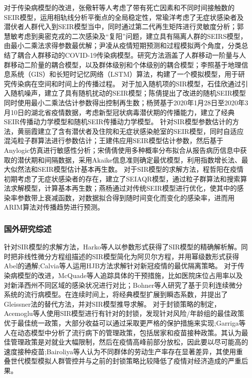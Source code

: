 对于传染病模型的改进，张儆轩\cite{张儆轩2021考虑死亡因素和不同时段接触数的}等人考虑了带有死亡因素和不同时间接触数的SEIR模型，运用相轨线分析平衡点的全局稳定性，常瑜洋\cite{常瑜洋2023基于}考虑了无症状感染者及潜伏者人群代入到SEIR模型当中，同时通过第二代再生矩阵进行灵敏度分析；郭慧敏\cite{郭慧敏2023基于隔离人群的}考虑到奥密克戎的二次感染及“复阳”问题，建立具有隔离人群的SEIRS模型，由最小二乘法求得参数最优解；尹凌\cite{尹凌2021耦合人群移动的}从疫情短期预测和过程模拟两个角度，分类总结了耦合人群移动的COVID-19传染病模型。研究方法涵盖了人群移动一阶量与人群移动二阶量的耦合模型，以及群体级别和个体级别的耦合模型；李照\cite{李照2021一种耦合}基于地理信息系统（GIS）和长短时记忆网络（LSTM）算法，构建了一个模拟模型，用于研究传染病在空间和时间上的传播过程。
对于加入随机项的SIR模型，石佳欣\cite{石佳欣2022一类随机系统基本再生数的计算与应用}通过引入随机噪声，建立了具有随机扰动的SEIR模型；陈倩\cite{陈倩2023基于改进的随机}提出了改进的随机SEIR模型同时使用最小二乘法估计参数得出控制再生数；杨赟\cite{杨赟2022基于随机}基于2020年1月28日至2020年3月10日的湖北省疫情数据，考虑新型冠状病毒潜伏期的传播能力，建立了经典SEIR传播动力学模型和随机SEIR传播动力学模型。
针对SIR模型参数估计的方法，黄丽霞\cite{黄丽霞2023基于分阶段}建立了含有潜伏者及住院和无症状感染舱室的SEIR模型，同时自适应混沌粒子群算法进行参数估计；王建伟\cite{王建伟2020基于广义}应用SEIR模型估计参数，然后基于Anylogic仿真进行敏感性分析；宋倩倩\cite{宋倩倩2020新型冠状病毒肺炎的早期传染病流行病学参数估计研究}使用多种概率分布拟合从报告病历信息中获取的潜伏期和间隔数据，采用Akaike信息准则确定最优模型，利用指数增长法、最大似然法和SEIR模型估计基本再生数。
对于SIR模型的求解方法，程哲阳\cite{1021167897.nh}在疫情初期考虑了无症状感染者的存在，建立了SEIAQR模型，通过粒子群算法和搜索算法求解模型，计算基本再生数；燕杨\cite{燕杨2021基于改进}通过对传统SEIR模型进行优化，使其中的感染率参数带上衰减函数，对数据拟合得到随时间变化而变化的感染率，进而用ARIM算法对传播趋势进行预测。

\subsubsection{国外研究综述}
针对SIR模型的求解方法，Harko\cite{harko2014exact}等人以参数形式获得了SIR模型的精确解析解。同时把非线性微分方程组描述的SIR模型简化为阿贝尔方程，并用幂级数形式获得Abel的通解;Calvia\cite{calvia2024simple}等人运用HJB方法求解针对新冠疫情的最优隔离策略。
对于传染病模型的改进，McQuade\cite{mcquade2021control}等人追踪具体的干预措施，比如医院床位占用率以及对新泽西州不同区域的感染状况进行对比；Bohner\cite{bohner2019exact}等人研究了基于贝利连续微分系统的流行病模型。在连续时间上，将经典模型扩展到瞬态系数，并提出了Gleissner法的替代方法，并对SIR模型推导求解。
对于封锁策略的制定，Acemoglu\cite{acemoglu2021optimal}等人使用SIR模型进行有针对的封锁，发现针对风险/年龄组的最佳政策优于最佳统一政策，大部分收益可以通过采取更严格的保护措施来实现;Garriga\cite{garriga2022optimal}等人在动态模型中分析了流行病下的管理政策，包括居家和疫苗接种政策。其认为最佳管理政策是对就业大幅限制，然后在疫情高峰前部分放松，因此要以尽可能高的速度接种疫苗;Bairoliya\cite{bairoliya2023macroeconomic}等人认为不同群体的劳动生产率存在显著差异，其使用重叠世代模型模拟人群管控并与之前的封锁策略比较降低了疫情对经济造成的严重后果。

